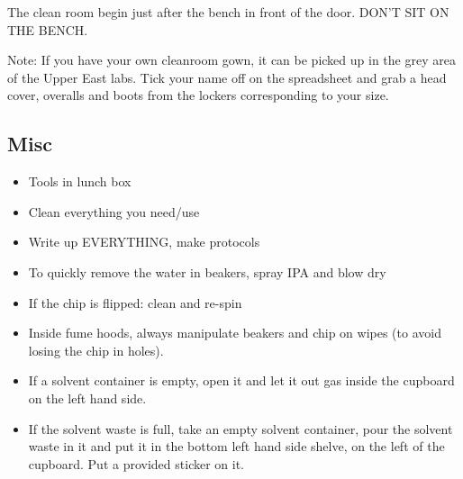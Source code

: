 The clean room begin just after the bench in front of the door. DON'T SIT ON THE BENCH.

Note: If you have your own cleanroom gown, it can be picked up in the grey area of the Upper East labs.
Tick your name off on the spreadsheet and grab a head cover, overalls and boots from the lockers corresponding
to your size.

\subsection{Misc}

\begin{itemize}
\item Tools in lunch box
\item Clean everything you need/use
\item Write up EVERYTHING, make protocols
\item To quickly remove the water in beakers, spray IPA and blow dry
\item If the chip is flipped: clean and re-spin
\item Inside fume hoods, always manipulate beakers and
chip on wipes (to avoid losing the chip in holes).
\item If a solvent container is empty, open it and let it out gas inside
the cupboard on the left hand side.
\item If the solvent waste is full, take an empty solvent container,
pour the solvent waste in it and put it in the bottom left hand
side shelve, on the left of the cupboard. Put a provided sticker
on it.
\end{itemize}

\newpage


